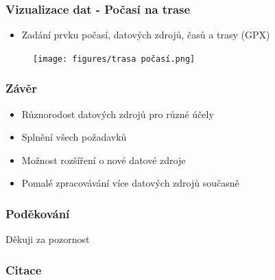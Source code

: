 \documentclass{beamer}
\begin{document}
	\begin{frame}
		\frametitle{Vizualizace dat - Počasí na trase}
		
		\begin{itemize}
			\item Zadání prvku počasí, datových zdrojů, časů a trasy (GPX)
		\end{itemize}
	
		\begin{figure}
			
			\texttt{[image: figures/trasa počasí.png]}
			
		\end{figure}
		
	\end{frame}

	\begin{frame}
		\frametitle{Závěr}
		
		\begin{itemize}
			\item Různorodost datových zdrojů pro různé účely
			\item Splnění všech požadavků
			\item Možnost rozšíření o nové datové zdroje
			\item Pomalé zpracovávání více datových zdrojů současně
		\end{itemize}
	\end{frame}

	\begin{frame}
		\frametitle{Poděkování}
		
		\begin{center}
			\Huge
			Děkuji za pozornost
		\end{center}
		
	\end{frame}

	\begin{frame}
		\frametitle{Citace}
		
		\nocite{*}
		
		\printbibliography
		
	\end{frame}
	
\end{document}
